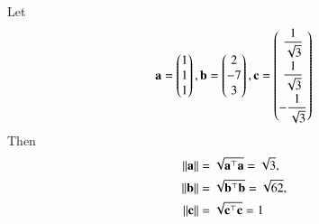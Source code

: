 Let 
\begin{align}
	\mathbf{a} = \begin{pmatrix}1\\1\\1\end{pmatrix} , \mathbf{b} = \begin{pmatrix}2\\ -7 \\ 3\end{pmatrix}, 
\mathbf{c} = \begin{pmatrix}\dfrac{1}{\sqrt{3}}\\[2ex] \dfrac{1}{\sqrt{3}} \\[2ex] -\dfrac{1}{\sqrt{3}}\end{pmatrix} 
\label{eq:chapters/12/10/2/1/1}
\end{align}
Then
\begin{align}
	\lVert\mathbf{a}\rVert&=\sqrt{\mathbf{a}^{\top}\mathbf{a}}=\sqrt{3}, 
	\label{eq:chapters/12/10/2/1/3}
	\\ \lVert\mathbf{b}\rVert&=\sqrt{\mathbf{b}^{\top}\mathbf{b}}= \sqrt{62}, 
	\label{eq:chapters/12/10/2/1/4}
	\\ \lVert\mathbf{c}\rVert&=\sqrt{\mathbf{c}^{\top}\mathbf{c}}	
=1
	\label{eq:chapters/12/10/2/1/5}
\end{align}



